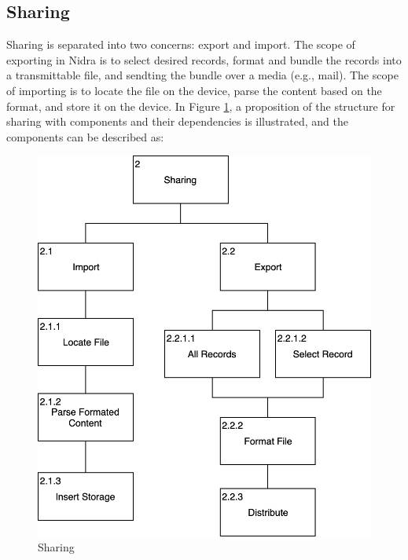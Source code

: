 \subsection{Sharing} \label{sec:design_sharing}

Sharing is separated into two concerns: export and import. The scope of exporting in Nidra is to select desired records, format and bundle the records into a transmittable file, and sendting the bundle over a media (e.g., mail). The scope of importing is to locate the file on the device, parse the content based on the format, and store it on the device. In Figure \ref{fig:hta_sharing}, a proposition of the structure for sharing with components and their dependencies is illustrated, and the components can be described as:


\begin{figure}
    \centering
    \includegraphics[scale=0.3]{images/Sharing.png}
    \caption{Sharing}
    \label{fig:hta_sharing}
\end{figure}

